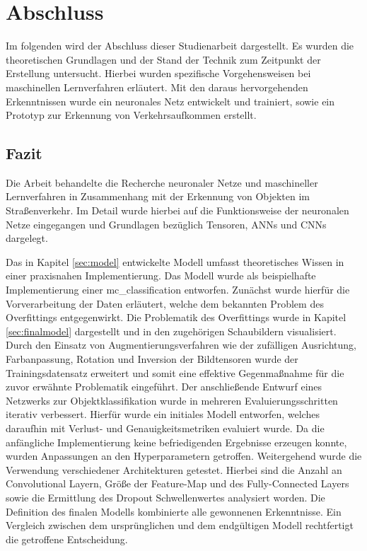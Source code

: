 \chapter{Abschluss}

Im folgenden wird der Abschluss dieser Studienarbeit dargestellt. Es wurden die theoretischen Grundlagen und der Stand der Technik zum Zeitpunkt der Erstellung untersucht. Hierbei wurden spezifische Vorgehensweisen bei maschinellen Lernverfahren erläutert. Mit den daraus hervorgehenden Erkenntnissen wurde ein neuronales Netz entwickelt und trainiert, sowie ein Prototyp zur Erkennung von Verkehrsaufkommen erstellt.  

\section{Fazit}

Die Arbeit behandelte die Recherche neuronaler Netze und maschineller Lernverfahren in Zusammenhang mit der Erkennung von Objekten im Straßenverkehr. Im Detail wurde hierbei auf die Funktionsweise der neuronalen Netze eingegangen und Grundlagen bezüglich Tensoren, \acp{ANN} und \acp{CNN} dargelegt. 

Das in Kapitel \ref{sec:model} entwickelte Modell umfasst theoretisches Wissen in einer praxisnahen Implementierung. Das Modell wurde als beispielhafte Implementierung einer \gls{mc_classification} entworfen. Zunächst wurde hierfür die Vorverarbeitung der Daten erläutert, welche dem bekannten Problem des Overfittings entgegenwirkt. Die Problematik des Overfittings wurde in Kapitel \ref{sec:finalmodel} dargestellt und in den zugehörigen Schaubildern visualisiert. Durch den Einsatz von Augmentierungsverfahren wie der zufälligen Ausrichtung, Farbanpassung, Rotation und Inversion der Bildtensoren wurde der Trainingsdatensatz erweitert und somit eine effektive Gegenmaßnahme für die zuvor erwähnte Problematik eingeführt. Der anschließende Entwurf eines Netzwerks zur Objektklassifikation wurde in mehreren Evaluierungsschritten iterativ verbessert. Hierfür wurde ein initiales Modell entworfen, welches daraufhin mit Verlust- und Genauigkeitsmetriken evaluiert wurde. Da die anfängliche Implementierung keine befriedigenden Ergebnisse erzeugen konnte, wurden Anpassungen an den Hyperparametern getroffen. Weitergehend wurde die Verwendung verschiedener Architekturen getestet. Hierbei sind die Anzahl an Convolutional Layern, Größe der Feature-Map und des Fully-Connected Layers sowie die Ermittlung des Dropout Schwellenwertes analysiert worden. Die Definition des finalen Modells kombinierte alle gewonnenen Erkenntnisse. Ein Vergleich zwischen dem ursprünglichen und dem endgültigen Modell rechtfertigt die getroffene Entscheidung.

